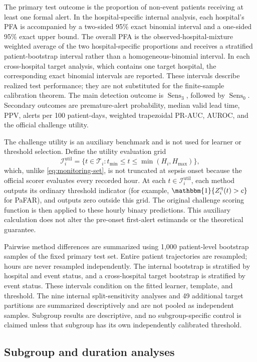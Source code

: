 \documentclass[11pt]{article}
\newcommand{\Ind}{\mathbbm{1}}
\newcommand{\calI}{\mathcal{I}}
\newcommand{\calT}{\mathcal{T}}
\newcommand{\Sens}{\operatorname{Sens}}
\begin{document}
The primary test outcome is the proportion of non-event patients receiving at least one formal alert. In the hospital-specific internal analysis, each hospital's PFA is accompanied by a two-sided 95\% exact binomial interval and a one-sided 95\% exact upper bound. The overall PFA is the observed-hospital-mixture weighted average of the two hospital-specific proportions and receives a stratified patient-bootstrap interval rather than a homogeneous-binomial interval. In each cross-hospital target analysis, which contains one target hospital, the corresponding exact binomial intervals are reported. These intervals describe realized test performance; they are not substituted for the finite-sample calibration theorem. The main detection outcome is $\Sens_3$, followed by $\Sens_0$. Secondary outcomes are premature-alert probability, median valid lead time, PPV, alerts per 100 patient-days, weighted trapezoidal PR-AUC, AUROC, and the official challenge utility.

The challenge utility is an auxiliary benchmark and is not used for learner or threshold selection. Define the utility evaluation grid
\[
\calI_i^{\mathrm{util}}=\{t\in\calT_i:t_{\min}\le t\le\min(H_i,H_{\max})\},
\]
which, unlike \eqref{eq:monitoring-set}, is not truncated at sepsis onset because the official scorer evaluates every recorded hour. At each $t\in\calI_i^{\mathrm{util}}$, each method outputs its ordinary threshold indicator (for example, $\Ind\{Z_i^{\eta}(t)>c\}$ for PaFAR), and outputs zero outside this grid. The original challenge scoring function is then applied to these hourly binary predictions. This auxiliary calculation does not alter the pre-onset first-alert estimands or the theoretical guarantee.

Pairwise method differences are summarized using 1,000 patient-level bootstrap samples of the fixed primary test set. Entire patient trajectories are resampled; hours are never resampled independently. The internal bootstrap is stratified by hospital and event status, and a cross-hospital target bootstrap is stratified by event status. These intervals condition on the fitted learner, template, and threshold. The nine internal split-sensitivity analyses and 49 additional target partitions are summarized descriptively and are not pooled as independent samples. Subgroup results are descriptive, and no subgroup-specific control is claimed unless that subgroup has its own independently calibrated threshold.

\subsection{Subgroup and duration analyses}
\end{document}
